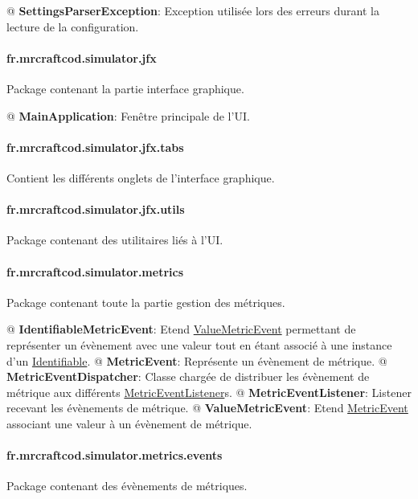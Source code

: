 \documentclass[final]{polytech/polytech}
\newcommand{\class}[1]{\textbf{#1}\label{class:#1}}
\newcommand{\klass}[1]{\hyperref[class:#1]{#1}}
\begin{document}
				\begin{easylist}
					@ \class{SettingsParserException}: Exception utilisée lors des erreurs durant la lecture de la configuration.
				\end{easylist}
				
			\paragraph{fr.mrcraftcod.simulator.jfx}
				Package contenant la partie interface graphique.
				
				\begin{easylist}
					@ \class{MainApplication}: Fenêtre principale de l'UI.
				\end{easylist}
				
			\paragraph{fr.mrcraftcod.simulator.jfx.tabs}
				Contient les différents onglets de l'interface graphique.

			\paragraph{fr.mrcraftcod.simulator.jfx.utils}
				Package contenant des utilitaires liés à l'UI.
				
			\paragraph{fr.mrcraftcod.simulator.metrics}
				Package contenant toute la partie gestion des métriques.
				
				\begin{easylist}
					@ \class{IdentifiableMetricEvent}: Etend \klass{ValueMetricEvent} permettant de représenter un évènement avec une valeur tout en étant associé à une instance d'un \klass{Identifiable}.
					@ \class{MetricEvent}: Représente un évènement de métrique.
					@ \class{MetricEventDispatcher}: Classe chargée de distribuer les évènement de métrique aux différents \klass{MetricEventListener}s.
					@ \class{MetricEventListener}: Listener recevant les évènements de métrique.
					@ \class{ValueMetricEvent}: Etend \klass{MetricEvent} associant une valeur à un évènement de métrique.
				\end{easylist}
				
			\paragraph{fr.mrcraftcod.simulator.metrics.events}
				Package contenant des évènements de métriques.
				
\end{document}
